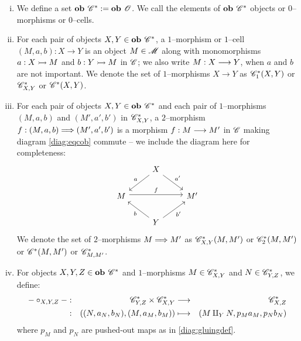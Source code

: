 \documentclass[./Thick_TQFTs_and_Quantum_Information.tex]{subfiles}
\begin{document}
\begin{enumerate}[(i)]

\item We define a set $\textbf{ob } \mathscr{C}^* := \textbf{ob } \mathscr{O}$. We call the elements
of $\textbf{ob } \mathscr{C}^*$ objects or $0$--morphisms or $0$--cells.

\item For each pair of objects $X, Y \in \textbf{ob } \mathscr{C}^*$, a $1$--morphism or
$1$--cell $(M, a, b) : X \to Y$ is an object $M \in \mathscr{M}$ along with
monomorphisms $a : X \stackrel{}{\rightarrowtail} M$ and $b : Y \stackrel{}{\rightarrowtail} M$ in $\mathscr{C}$; we also write
$M : X \stackrel{}{\longrightarrow} Y$, when $a$ and $b$ are not important. We denote the set of
$1$--morphisms $X \to Y$ as $\mathscr{C}^*_1(X, Y)$ or $\mathscr{C}^*_{X, Y}$ or
$\mathscr{C}^*(X, Y)$.

\item For each pair of objects $X, Y \in \textbf{ob } \mathscr{C}^*$ and each pair of
$1$--morphisms $(M, a, b)$ and $(M', a', b')$ in $\mathscr{C}^*_{X, Y}$, a
$2$--morphism $f : (M, a, b) \stackrel{}{\Longrightarrow} (M', a', b')$ is a morphism $f : M \stackrel{}{\longrightarrow} M'$ in
$\mathscr{C}$ making diagram \eqref{diag:eqcob} commute -- we include the diagram here
for completeness:
\[
  \begin{tikzcd}
    & X \arrow[dl, "a" above left] \arrow[dr, "a'" above right] & \\
    M \arrow[rr, "f" above, shift left] &
    & M' \\
    & Y \arrow[ul, "b" below left] \arrow[ur, "b'" below right] &
  \end{tikzcd}
\]
We denote the set of
$2$--morphisms $M \stackrel{}{\Longrightarrow} M'$ as $\mathscr{C}^*_{X, Y}(M, M')$ or $\mathscr{C}^*_2(M, M')$ or
$\mathscr{C}^*(M, M')$ or $\mathscr{C}^*_{M, M'}$.

\item For objects $X, Y, Z \in \textbf{ob } \mathscr{C}^*$ and $1$--morphisms
$M \in \mathscr{C}^*_{X, Y}$ and $N \in \mathscr{C}^*_{Y, Z}$, we define:
\begin{align*}
  - \circ_{X, Y, Z} -
    &:& \mathscr{C}^*_{Y, Z} \times \mathscr{C}^*_{X, Y}
      &\stackrel{}{\longrightarrow}& \mathscr{C}^*_{X, Z} \\
    &:& ((N, a_N, b_N), (M, a_M, b_M))
      &\longmapsto& (M \amalg_{Y} N, p_Ma_M, p_Nb_N)
\end{align*}
where $p_M$ and $p_N$ are pushed-out maps as in \eqref{diag:gluingdef}.

\end{enumerate}
\end{document}
